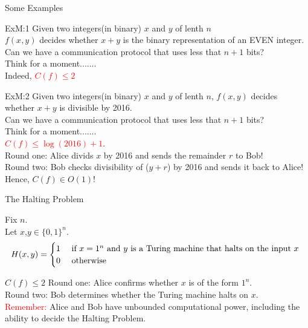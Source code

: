 \documentclass[9pt]{beamer}
\begin{document}
\begin{frame}{Some Examples}
  \begin{block}{ExM:1}
    Given two integers(in binary) $x$ and $y$ of lenth $n$ \\
    $f(x,y)$ decides whether $x+y$ is the binary representation of an EVEN integer.\\
    Can we have a communication protocol that uses less that $n+1$ bits?\\
    \pause
    Think for a moment.......\\ 
    \pause
    Indeed, \textcolor{red}{$C(f)\leq 2$}
  \end{block}
  \pause
  \begin{block}{ExM:2 }
    Given two integers(in binary) $x$ and $y$ of lenth $n$, $f(x,y)$ decides whether 
    $x+y$ is divisible by 2016.\\
    \pause
    Can we have a communication protocol that uses less that $n+1$ bits?\\
    \pause
    Think for a moment.......\\
    \pause
    \textcolor{red}{$C(f)\leq \log(2016)+1$}.\\
    \pause 
    Round one: Alice divids $x$ by 2016 and sends the remainder $r$ to Bob!\\
    Round two: Bob checks divisibility of ($y+r$) by 2016 and sends it back to 
    Alice!\\
    Hence, $C(f)\in O(1)$!  
\end{block}
\end{frame}

\begin{frame}{The Halting Problem}
  \begin{block}{}
    Fix $n$.\\
    Let $x$,$y\in\{0,1\}^n$.\\
    \[
    H(x,y) =
    \begin{cases} 
      \hfill 1    \hfill & \text{ if $x=1^n$
        and $y$ is a Turing machine that 
        halts on the input $x$ } \\
      \hfill 0 \hfill & \text{ otherwise} \\
    \end{cases}
    \]
  \end{block}
  \pause
  \begin{block}{$C(f)\leq 2$}
    Round one: Alice confirms whether $x$ is of the form $1^n$.\\
    Round two: Bob determines whether the Turing machine halts on $x$.\\
    \textcolor{red}{Remember:} Alice and Bob have unbounded computational power, 
    including 
    the ability to decide the 
    Halting Problem. 
  \end{block}
\end{frame}
\end{document}
